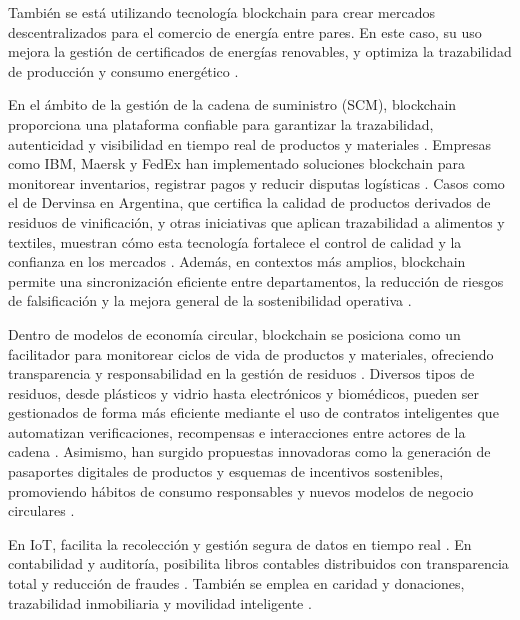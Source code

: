 También se está utilizando tecnología blockchain para crear mercados descentralizados para el comercio de energía entre pares. En este caso, su uso mejora la gestión de certificados de energías renovables, y optimiza la trazabilidad de producción y consumo energético \cite{sunny2022systematic, vaigandla2023review}.

En el ámbito de la gestión de la cadena de suministro (SCM), blockchain proporciona una plataforma confiable para garantizar la trazabilidad, autenticidad y visibilidad en tiempo real de productos y materiales \cite{torres2022tendencias, sharabati2024blockchain}. Empresas como IBM, Maersk y FedEx han implementado soluciones blockchain para monitorear inventarios, registrar pagos y reducir disputas logísticas \cite{tripathi2023comprehensive}. Casos como el de Dervinsa en Argentina, que certifica la calidad de productos derivados de residuos de vinificación, y otras iniciativas que aplican trazabilidad a alimentos y textiles, muestran cómo esta tecnología fortalece el control de calidad y la confianza en los mercados \cite{bartolomeo2020introduccion}. Además, en contextos más amplios, blockchain permite una sincronización eficiente entre departamentos, la reducción de riesgos de falsificación y la mejora general de la sostenibilidad operativa \cite{sunny2022systematic}.

Dentro de modelos de economía circular, blockchain se posiciona como un facilitador para monitorear ciclos de vida de productos y materiales, ofreciendo transparencia y responsabilidad en la gestión de residuos \cite{bulkowska2023implementation, baralla2023waste}. Diversos tipos de residuos, desde plásticos y vidrio hasta electrónicos y biomédicos, pueden ser gestionados de forma más eficiente mediante el uso de contratos inteligentes que automatizan verificaciones, recompensas e interacciones entre actores de la cadena \cite{baralla2023waste}. Asimismo, han surgido propuestas innovadoras como la generación de pasaportes digitales de productos y esquemas de incentivos sostenibles, promoviendo hábitos de consumo responsables y nuevos modelos de negocio circulares \cite{baralla2023waste}.

En IoT, facilita la recolección y gestión segura de datos en tiempo real \cite{sunny2022systematic}. En contabilidad y auditoría, posibilita libros contables distribuidos con transparencia total y reducción de fraudes \cite{bartolomeo2020introduccion}. También se emplea en caridad y donaciones, trazabilidad inmobiliaria y movilidad inteligente \cite{bartolomeo2020introduccion}. 

